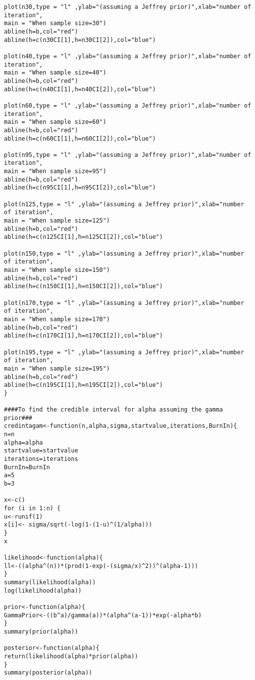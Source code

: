 \documentclass[a4paper,12pt]{report}
\begin{document}
{\begin{verbatim}
plot(n30,type = "l" ,ylab="(assuming a Jeffrey prior)",xlab="number of iteration",
main = "When sample size=30")
abline(h=b,col="red")
abline(h=c(n30CI[1],h=n30CI[2]),col="blue")

plot(n40,type = "l" ,ylab="(assuming a Jeffrey prior)",xlab="number of iteration",
main = "When sample size=40")
abline(h=b,col="red")
abline(h=c(n40CI[1],h=n40CI[2]),col="blue")

plot(n60,type = "l" ,ylab="(assuming a Jeffrey prior)",xlab="number of iteration",
main = "When sample size=60")
abline(h=b,col="red")
abline(h=c(n60CI[1],h=n60CI[2]),col="blue")

plot(n95,type = "l" ,ylab="(assuming a Jeffrey prior)",xlab="number of iteration",
main = "When sample size=95")
abline(h=b,col="red")
abline(h=c(n95CI[1],h=n95CI[2]),col="blue")

plot(n125,type = "l" ,ylab="(assuming a Jeffrey prior)",xlab="number of iteration",
main = "When sample size=125")
abline(h=b,col="red")
abline(h=c(n125CI[1],h=n125CI[2]),col="blue")

plot(n150,type = "l" ,ylab="(assuming a Jeffrey prior)",xlab="number of iteration",
main = "When sample size=150")
abline(h=b,col="red")
abline(h=c(n150CI[1],h=n150CI[2]),col="blue")

plot(n170,type = "l" ,ylab="(assuming a Jeffrey prior)",xlab="number of iteration",
main = "When sample size=170")
abline(h=b,col="red")
abline(h=c(n170CI[1],h=n170CI[2]),col="blue")

plot(n195,type = "l" ,ylab="(assuming a Jeffrey prior)",xlab="number of iteration",
main = "When sample size=195")
abline(h=b,col="red")
abline(h=c(n195CI[1],h=n195CI[2]),col="blue")
}

####To find the credible interval for alpha assuming the gamma prior###
credintagam<-function(n,alpha,sigma,startvalue,iterations,BurnIn){
n=n
alpha=alpha
startvalue=startvalue
iterations=iterations
BurnIn=BurnIn
a=5
b=3

x<-c()
for (i in 1:n) {
u<-runif(1)
x[i]<- sigma/sqrt(-log(1-(1-u)^(1/alpha)))
}
x

likelihood<-function(alpha){
ll<-((alpha^(n))*(prod(1-exp(-(sigma/x)^2))^(alpha-1)))
}
summary(likelihood(alpha))
log(likelihood(alpha))

prior<-function(alpha){
GammaPrior<-((b^a)/gamma(a))*(alpha^(a-1))*exp(-alpha*b)
}
summary(prior(alpha))

posterior<-function(alpha){
return(likelihood(alpha)*prior(alpha))
}
summary(posterior(alpha))



\end{verbatim}}
\end{document}
